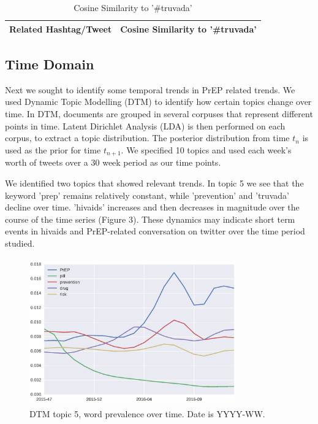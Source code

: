 \documentclass{sig-alternate-05-2015}
\begin{document}
\begin{table}
\centering
\caption{Cosine Similarity to '\#truvada'}
\begin{tabular}{|l|c|} \hline
Related Hashtag/Tweet & Cosine Similarity to '\#truvada'\\ \hline
\hline\end{tabular}
\end{table}


\subsection{Time Domain}

Next we sought to identify some temporal trends in PrEP related trends. We used Dynamic Topic Modelling (DTM) to identify how certain topics change over time. In DTM, documents are grouped in several corpuses that represent different points in time. Latent Dirichlet Analysis (LDA) is then performed on each corpus, to extract a topic distribution. The posterior distribution from time $t_n$ is used as the prior for time $t_{n+1}$. We specified 10 topics and used each week's worth of tweets over a 30 week period as our time points.


We identified two topics that showed relevant trends. In topic 5 we see that the keyword 'prep' remains relatively constant, while 'prevention' and 'truvada' decline over time. 'hivaids' increases and then decreases in magnitude over the course of the time series (Figure 3). These dynamics may indicate short term events in hivaids and PrEP-related conversation on twitter over the time period studied.

\begin{figure}
\centering
\includegraphics[height=2.5in, width=3.5in]{DTMfig1}
\caption{DTM topic 5, word prevalence over time. Date is YYYY-WW.}
\end{figure}
\end{document}
